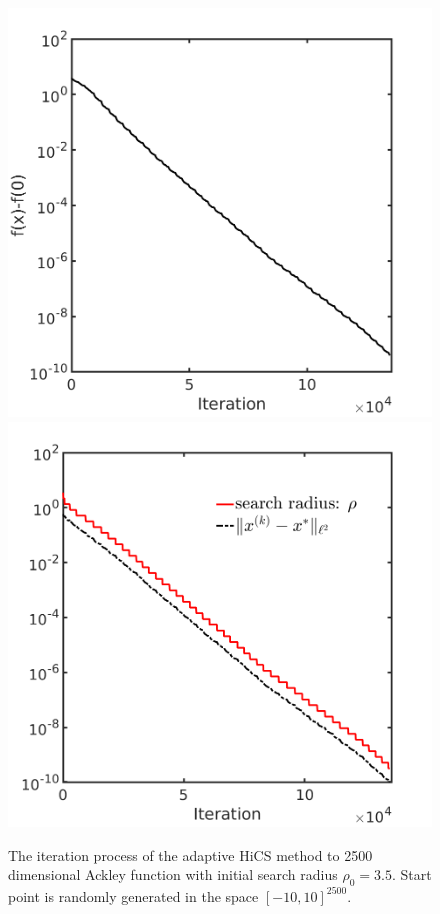 \documentclass[final,1p,times]{elsarticle}
\begin{document}
\begin{figure}[!htbp] 
	\centering
	\includegraphics[scale=0.25]{../figures/ackley2500D.png}
	\includegraphics[scale=0.25]{../figures/ackley2500D_dist.png}
	  \caption{The iteration process of the adaptive HiCS method to 2500
	  dimensional Ackley function with initial search
	  radius $\rho_0=3.5$. Start point is randomly generated in the
	  space $[-10, 10]^{2500}$. } 
	\label{fig:ackley2500D:AHiCS}
\end{figure}
\end{document}
